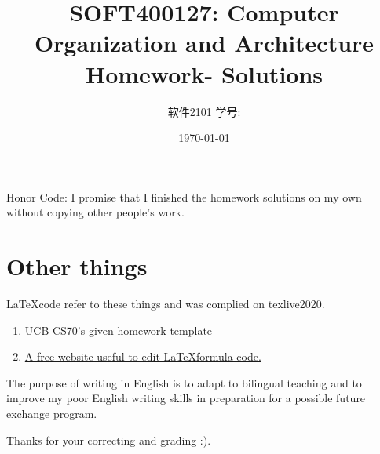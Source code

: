\documentclass[11pt]{article}
\title{\vspace{-4cm}SOFT400127: Computer Organization and Architecture 
        \newline  \Session \space Homework-\textbf{\Homework} Solutions}
\author{软件2101 \Name 学号: \SID}
\date{\today}
\begin{document}
\maketitle

Honor Code: I promise that I finished the homework solutions on my own without copying other people's 
    work.



\section*{Other things}

\LaTeX \space code refer to these things and was complied on texlive2020.
\begin{enumerate}
    \item  UCB-CS70's given homework template 
    \item  \href{https://www.latexlive.com}{A free website useful to edit \LaTeX \space formula code.}
\end{enumerate}

The purpose of writing in English is to adapt to bilingual teaching and to improve my poor English 
writing skills in preparation for a possible future exchange program. 

Thanks for your correcting and grading :).
\end{document}
